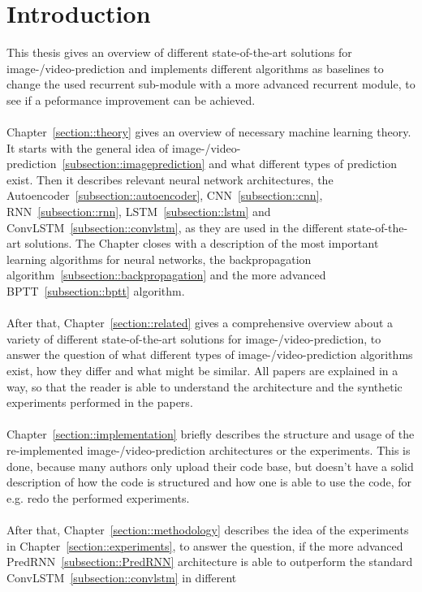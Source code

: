 \section{Introduction} \label{section::introduction}
 This thesis gives an overview of different state-of-the-art solutions for image-/video-prediction and implements different algorithms as baselines to change the 
 used recurrent sub-module with a more advanced recurrent module, to see if a peformance improvement can be achieved.
 \\\\
 Chapter~\ref{section::theory} gives an overview of necessary machine learning theory. It starts with the general idea of
 image-/video-prediction~\ref{subsection::imageprediction} and what different types of prediction exist. Then it describes relevant neural network architectures, the 
 Autoencoder~\ref{subsection::autoencoder}, CNN~\ref{subsection::cnn}, RNN~\ref{subsection::rnn}, LSTM~\ref{subsection::lstm} and
 ConvLSTM~\ref{subsection::convlstm}, as they are used in the different state-of-the-art solutions. The Chapter closes with
 a description of the most important learning algorithms for neural networks, the backpropagation algorithm~\ref{subsection::backpropagation} and the more advanced 
 BPTT~\ref{subsection::bptt} algorithm.
 \\\\
 After that, Chapter~\ref{section::related} gives a comprehensive overview about a variety of different state-of-the-art solutions for image-/video-prediction,
 to answer the question of what different types of image-/video-prediction algorithms exist, how they differ and what might be similar. All papers are explained
 in a way, so that the reader is able to understand the architecture and the synthetic experiments performed in the papers.
 \\\\
 Chapter~\ref{section::implementation} briefly describes the structure and usage of the re-implemented image-/video-prediction architectures or the experiments. 
 This is done, because many authors only upload
 their code base, but doesn't have a solid description of how the code is structured and how one is able to use the code, for e.g. redo the performed experiments.
 \\\\
 After that, Chapter~\ref{section::methodology} describes the idea of the experiments in Chapter~\ref{section::experiments}, to answer the question, if
 the more advanced PredRNN~\ref{subsection::PredRNN} architecture is able to outperform the standard ConvLSTM~\ref{subsection::convlstm} in different
